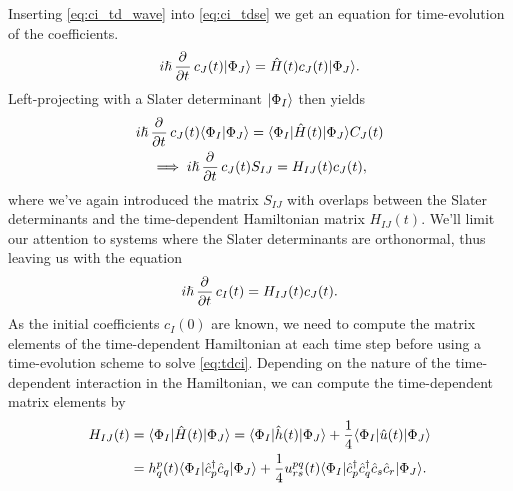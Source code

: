         Inserting \autoref{eq:ci_td_wave} into \autoref{eq:ci_tdse} we get an
        equation for time-evolution of the coefficients.
        \begin{align}
            i\hslash \dpd[]{}{t}c_{J}(t)\ket{\Phi_J}
            = \hamil(t) c_{J}(t)\ket{\Phi_J}.
        \end{align}
        Left-projecting with a Slater determinant $| \Phi_I \rangle$ then yields
        \begin{gather}
            i\hslash \dpd[]{}{t}c_{J}(t)\braket{\Phi_I}{\Phi_J}
            = \bra{\Phi_I}\hamil(t)\ket{\Phi_J} C_{J}(t) \\
            \implies
            i\hslash \dpd[]{}{t}c_{J}(t) S_{IJ}
            = H_{IJ}(t) c_{J}(t),
        \end{gather}
        where we've again introduced the matrix $S_{IJ}$ with overlaps between
        the Slater determinants and the time-dependent Hamiltonian matrix
        $H_{IJ}(t)$.
        We'll limit our attention to systems where the Slater determinants are
        orthonormal, thus leaving us with the equation
        \begin{align}
            i\hslash \dpd[]{}{t}c_{I}(t)
            = H_{IJ}(t) c_{J}(t).
            \label{eq:tdci}
        \end{align}
        As the initial coefficients $c_{I}(0)$ are known, we need to compute the
        matrix elements of the time-dependent Hamiltonian at each time step
        before using a time-evolution scheme to solve \autoref{eq:tdci}.
        Depending on the nature of the time-dependent interaction in the
        Hamiltonian, we can compute the time-dependent matrix elements by
        \begin{align}
            H_{IJ}(t)
            &= \langle \Phi_I |\hat{H}(t)| \Phi_J \rangle
            = \langle \Phi_I |\hat{h}(t)| \Phi_J \rangle
            + \frac{1}{4}\langle \Phi_I |\hat{u}(t)| \Phi_J \rangle
            \\
            &=
            h^{p}_{q}(t)
            \langle \Phi_I |\hat{c}_{p}^{\dagger}\hat{c}_{q}| \Phi_J \rangle
            + \frac{1}{4}u^{pq}_{rs}(t)
            \langle \Phi_I |\hat{c}_{p}^{\dagger}\hat{c}_{q}^{\dagger}\hat{c}_{s}\hat{c}_{r}| \Phi_J \rangle.
        \end{align}
